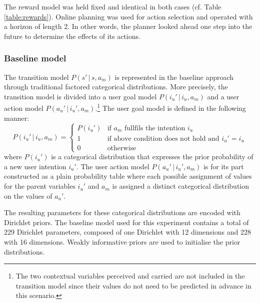 The reward model was held fixed and identical in both cases (cf. Table \ref{table:rewards}). Online planning was used for action selection and operated with a horizon of length 2. In other words, the planner looked ahead one step into the future to determine the effects of its actions.  




\subsubsection*{Baseline model}

The transition model $P(s'\, | \, s, a_m)$ is represented in the baseline approach through traditional factored categorical distributions. More precisely, the transition model is divided into a user goal model $P(i_u'\, | \, i_u, a_m)$ and a user action model $P(a_u' \, | \, i_u',a_m)$.\footnote{The two contextual variables $\mathrm{perceived}$ and $\mathrm{carried}$ are not included in the transition model since their values do not need to be predicted in advance in this scenario.} The user goal model is defined in the following manner:
\begin{equation}
P(i_u' \, | \, i_u, a_m) = \begin{cases}
P(i_u') & \text{if } a_m \text{ fullfils the intention } i_u \\
1 & \text{if above condition does not hold and } i_u' = i_u \\
0 & \text{otherwise} \end{cases} \nonumber
\end{equation}
where $P(i_u')$ is a categorical distribution that expresses the prior probability of a new user intention $i_u'$. The user action model $P(a_u' \, | \, i_u',a_m)$ is for its part constructed as a plain probability table where each possible assignment of values for the parent variables $i_u'$ and $a_m$ is assigned a distinct categorical distribution on the values of $a_u'$. 

The resulting parameters for these categorical distributions are encoded with Dirichlet priors.  The baseline model used for this experiment contains a total of 229 Dirichlet parameters, composed of one Dirichlet with 12 dimensions and 228 with 16 dimensions.  Weakly informative priors are used to initialise the prior distributions.

